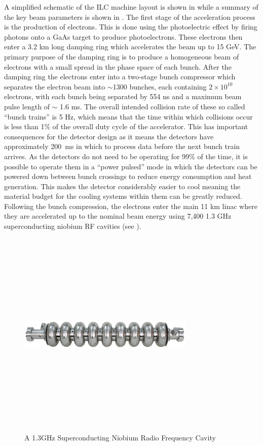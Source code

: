 A simplified schematic of the \ac{ILC} machine layout is shown in  while a summary of the key beam parameters is shown in . The first stage of the acceleration process is the production of electrons. This is done using the photoelectric effect by firing photons onto a GaAs target to produce photoelectrons. These electrons then enter a 3.2 km long damping ring which accelerates the beam up to 15 GeV. The primary purpose of the damping ring is to produce a homogeneous beam of electrons with a small spread in the phase space of each bunch. After the damping ring the electrons enter into a two-stage bunch compressor which separates the electron beam into ${\sim}$1300 bunches, each containing ${2\times10^{10}}$ electrons, with each bunch being separated by 554 ns and a maximum beam pulse length of $\sim$ 1.6 ms. The overall intended collision rate of these so called ``bunch trains'' is 5 Hz, which means that the time within which collisions occur is less than 1\% of the overall duty cycle of the accelerator. This has important consequences for the detector design as it means the detectors have approximately 200~ms in which to process data before the next bunch train arrives. As the detectors do not need to be operating for 99\% of the time, it is possible to operate them in a ``power pulsed'' mode in which the detectors can be powered down between bunch crossings to reduce energy consumption and heat generation. This makes the detector considerably easier to cool meaning the material budget for the cooling systems within them can be greatly reduced. Following the bunch compression, the electrons enter the main 11 km linac where they are accelerated up to the nominal beam energy using 7,400 1.3 GHz superconducting niobium \ac{RF} cavities (see ). 

\begin{figure}
  \centering
  \includegraphics[width=0.75\textwidth,height=10cm,keepaspectratio]{Experiments/fig/Cavity}
  \caption[Superconducting Cavities For The ILC]{A 1.3GHz Superconducting Niobium Radio Frequency Cavity \cite{ILCTDR}}
  \label{Fig:cavity}
\end{figure}

